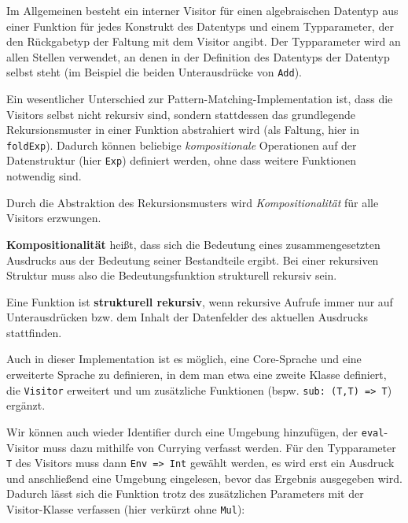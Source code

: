 \documentclass[]{article}
\begin{document}
Im Allgemeinen besteht ein interner Visitor für einen algebraischen
Datentyp aus einer Funktion für jedes Konstrukt des Datentyps und einem
Typparameter, der den Rückgabetyp der Faltung mit dem Visitor angibt.
Der Typparameter wird an allen Stellen verwendet, an denen in der
Definition des Datentyps der Datentyp selbst steht (im Beispiel die
beiden Unterausdrücke von \texttt{Add}).

Ein wesentlicher Unterschied zur Pattern-Matching-Implementation ist,
dass die Visitors selbst nicht rekursiv sind, sondern stattdessen das
grundlegende Rekursionsmuster in einer Funktion abstrahiert wird (als
Faltung, hier in \texttt{foldExp}). Dadurch können beliebige
\emph{kompositionale} Operationen auf der Datenstruktur (hier
\texttt{Exp}) definiert werden, ohne dass weitere Funktionen notwendig
sind.

Durch die Abstraktion des Rekursionsmusters wird
\emph{Kompositionalität} für alle Visitors erzwungen.

\textbf{Kompositionalität} heißt, dass sich die Bedeutung eines
zusammengesetzten Ausdrucks aus der Bedeutung seiner Bestandteile
ergibt. Bei einer rekursiven Struktur muss also die Bedeutungsfunktion
strukturell rekursiv sein.

Eine Funktion ist \textbf{strukturell rekursiv}, wenn rekursive Aufrufe
immer nur auf Unterausdrücken bzw. dem Inhalt der Datenfelder des
aktuellen Ausdrucks stattfinden.

Auch in dieser Implementation ist es möglich, eine Core-Sprache und eine
erweiterte Sprache zu definieren, in dem man etwa eine zweite Klasse
definiert, die \texttt{Visitor} erweitert und um zusätzliche Funktionen
(bspw. \texttt{sub:\ (T,T)\ =\textgreater{}\ T}) ergänzt.

Wir können auch wieder Identifier durch eine Umgebung hinzufügen, der
\texttt{eval}-Visitor muss dazu mithilfe von Currying verfasst werden.
Für den Typparameter \texttt{T} des Visitors muss dann
\texttt{Env\ =\textgreater{}\ Int} gewählt werden, es wird erst ein
Ausdruck und anschließend eine Umgebung eingelesen, bevor das Ergebnis
ausgegeben wird. Dadurch lässt sich die Funktion trotz des zusätzlichen
Parameters mit der Visitor-Klasse verfassen (hier verkürzt ohne
\texttt{Mul}):
\end{document}
